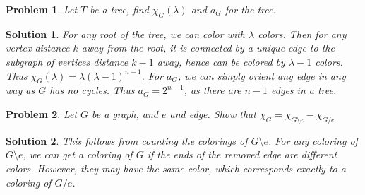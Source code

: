 \documentclass{article}
\theoremstyle{normal}
\newtheorem{problem}{Problem}
\theoremstyle{thmit}
\newtheorem*{solution}{Solution}
\begin{document}
    \begin{problem}
        Let $T$ be a tree, find $\chi_G(\lambda)$ and $a_G$ for the tree.
    \end{problem}
    \begin{solution}
        For any root of the tree, we can color with $\lambda$ colors. Then for any
        vertex distance $k$ away from the root, it is connected by a unique edge to the
        subgraph of vertices distance $k-1$ away, hence can be colored by $\lambda -1$
        colors. Thus $\chi_G(\lambda)=\lambda(\lambda-1)^{n-1}$. For $a_G$, we can simply
        orient any edge in any way as $G$ has no cycles. Thus $a_G=2^{n-1}$, as there are
        $n-1$ edges in a tree.
    \end{solution}
    \begin{problem}
        Let $G$ be a graph, and $e$ and edge. Show that
        $\chi_G=\chi_{G\setminus{e}}-\chi_{G/e}$
    \end{problem}
    \begin{solution}
        This follows from counting the colorings of $G\setminus{e}$. For any coloring of $G\setminus{e}$,
        we can get a coloring of $G$ if the ends of the removed edge are different colors.
        However, they may have the same color, which corresponds exactly to a coloring
        of $G/e$.
    \end{solution}
\end{document}
